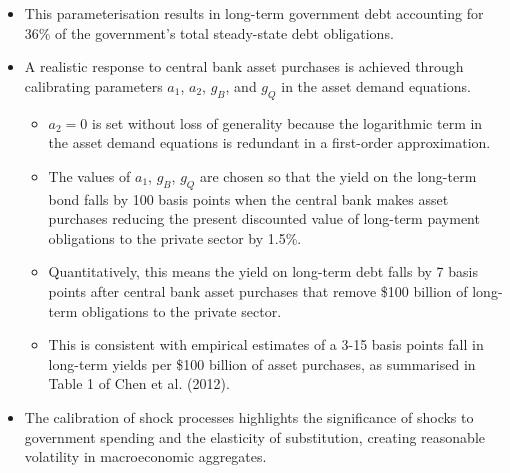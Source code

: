 \documentclass[12pt]{article}
\begin{document}
\begin{itemize}
    \item This parameterisation results in long-term government debt accounting for 36\% of the government's total steady-state debt obligations.
    \item A realistic response to central bank asset purchases is achieved through calibrating parameters $a_1$, $a_2$, $g_B$, and $g_Q$ in the asset demand equations.
    \begin{itemize}
        \item $a_2 = 0$ is set without loss of generality because the logarithmic term in the asset demand equations is redundant in a first-order approximation.
        \item The values of $a_1$, $g_B$, $g_Q$ are chosen so that the yield on the long-term bond falls by 100 basis points when the central bank makes asset purchases reducing the present discounted value of long-term payment obligations to the private sector by 1.5\%.
        \item Quantitatively, this means the yield on long-term debt falls by 7 basis points after central bank asset purchases that remove \$100 billion of long-term obligations to the private sector.
        \item This is consistent with empirical estimates of a 3-15 basis points fall in long-term yields per \$100 billion of asset purchases, as summarised in Table 1 of Chen et al. (2012).
    \end{itemize}
    \item The calibration of shock processes highlights the significance of shocks to government spending and the elasticity of substitution, creating reasonable volatility in macroeconomic aggregates.
\end{itemize}
\end{document}

